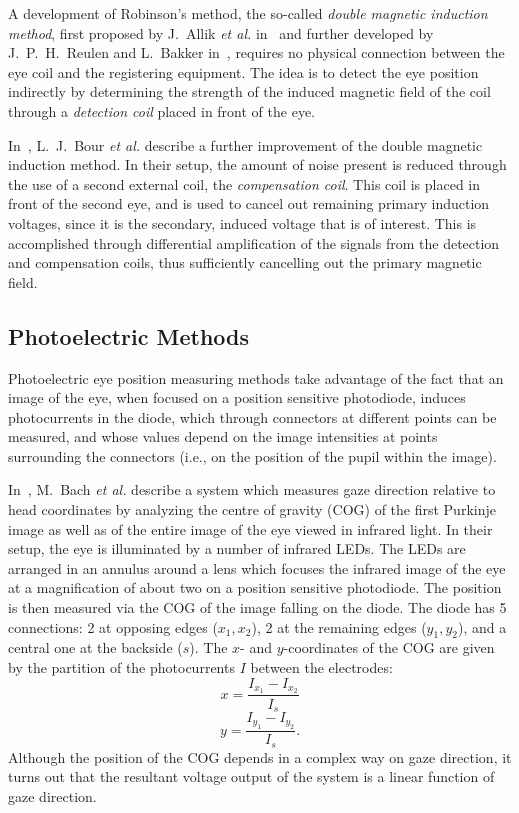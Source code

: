 A development of Robinson's method, the so-called {\em double magnetic
  induction method\/}, first proposed by J.\ Allik {\em et al.\/}
in~\cite{allik} and further developed by J.\ P.\ H.\ Reulen and L.\ 
Bakker in~\cite{reulen}, requires no physical connection between the
eye coil and the registering equipment.  The idea is to detect the eye
position indirectly by determining the strength of the induced
magnetic field of the coil through a {\em detection coil\/} placed in
front of the eye.

In~\cite{coil}, L.\ J.\ Bour {\em et al.\/} describe a further
improvement of the double magnetic induction method.  In their setup,
the amount of noise present is reduced through the use of a second
external coil, the {\em compensation coil\/}.  This coil is placed in
front of the second eye, and is used to cancel out remaining primary
induction voltages, since it is the secondary, induced voltage that is
of interest.  This is accomplished through differential amplification
of the signals from the detection and compensation coils, thus
sufficiently cancelling out the primary magnetic field.

\subsection{Photoelectric Methods}
\label{back:track:oculometer}

Photoelectric eye position measuring methods take advantage of the
fact that an image of the eye, when focused on a position sensitive
photodiode, induces photocurrents in the diode, which through
connectors at different points can be measured, and whose values
depend on the image intensities at points surrounding the connectors
(i.e., on the position of the pupil within the image).

In~\cite{oculometer}, M.\ Bach {\em et al.\/} describe a system which
measures gaze direction relative to head coordinates by analyzing the
centre of gravity (COG) of the first Purkinje image as well as of the
entire image of the eye viewed in infrared light.  In their setup, the
eye is illuminated by a number of infrared LEDs.  The LEDs are
arranged in an annulus around a lens which focuses the infrared image
of the eye at a magnification of about two on a position sensitive
photodiode.  The position is then measured via the COG of the image
falling on the diode.  The diode has 5 connections: 2 at opposing
edges ($x_{1},x_{2}$), 2 at the remaining edges ($y_{1},y_{2}$), and a
central one at the backside ($s$).  The $x$- and $y$-coordinates of
the COG are given by the partition of the photocurrents $I$ between
the electrodes:
\[x=\frac{I_{x_{1}}-I_{x_{2}}}{I_{s}}\] 
\[y=\frac{I_{y_{1}}-I_{y_{2}}}{I_{s}}\mbox{.}\] Although the position
of the COG depends in a complex way on gaze direction, it turns out
that the resultant voltage output of the system is a linear function
of gaze direction.

